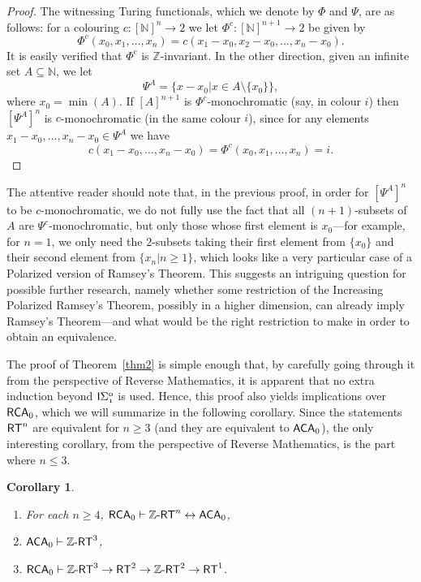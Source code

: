 \documentclass[10pt,a4paper]{amsart}
\newcommand{\rt}{\mathnormal{\mathsf{RT}}}
\newcommand{\zrt}{\mathnormal{\mathbb Z\text{-}\mathsf{RT}}}
\newcommand{\rca}{\mathnormal{\mathsf{RCA}}_0}
\newcommand{\aca}{\mathnormal{\mathsf{ACA}}_0}
\newcommand{\isigma}{\mathnormal{\mathsf{I}\mathrm{\Sigma}_1^0}}
\newtheorem{corollary}[theorem]{Corollary}
\theoremstyle{definition}
\begin{document}
\begin{proof}
The witnessing Turing functionals, which we denote by $\Phi$ and $\Psi$, are as follows: for a colouring $c:[\mathbb N]^n\longrightarrow 2$ we let $\Phi^c:[\mathbb N]^{n+1}\longrightarrow 2$ be given by
\begin{equation*}
\Phi^c(x_0,x_1,\ldots,x_n)=c(x_1-x_0,x_2-x_0,\ldots,x_n-x_0).
\end{equation*}
It is easily verified that $\Phi^c$ is $\mathbb Z$-invariant. In the other direction, given an infinite set $A\subseteq\mathbb N$, we let
\begin{equation*}
\Psi^A=\{x-x_0\big|x\in A\setminus\{x_0\}\},
\end{equation*}
where $x_0=\min(A)$. If $[A]^{n+1}$ is $\Phi^c$-monochromatic (say, in colour $i$) then $[\Psi^A]^n$ is $c$-monochromatic (in the same colour $i$), since for any elements $x_1-x_0,\ldots,x_n-x_0\in \Psi^A$ we have
\begin{equation*}
c(x_1-x_0,\ldots,x_n-x_0)=\Phi^c(x_0,x_1,\ldots,x_n)=i.
\end{equation*}
\end{proof}

The attentive reader should note that, in the previous proof, in order for $[\Psi^A]^n$ to be $c$-monochromatic, we do not fully use the fact that all $(n+1)$-subsets of $A$ are $\Psi^c$-monochromatic, but only those whose first element is $x_0$---for example, for $n=1$, we only need the $2$-subsets taking their first element from $\{x_0\}$ and their second element from $\{x_n\big|n\geq 1\}$, which looks like a very particular case of a Polarized version of Ramsey's Theorem. This suggests an intriguing question for possible further research, namely whether some restriction of the Increasing Polarized Ramsey's Theorem, possibly in a higher dimension, can already imply Ramsey's Theorem---and what would be the right restriction to make in order to obtain an equivalence.

The proof of Theorem~\ref{thm2} is simple enough that, by carefully going through it from the perspective of Reverse Mathematics, it is apparent that no extra induction beyond $\isigma$ is used. Hence, this proof also yields implications over $\rca$, which we will summarize in the following corollary. Since the statements $\rt^n$ are equivalent for $n\geq 3$ (and they are equivalent to $\aca$), the only interesting corollary, from the perspective of Reverse Mathematics, is the part where $n\leq 3$.

\begin{corollary}\label{cor:implicaciones-reverse}
\hfill
\begin{enumerate}
\item For each $n\geq 4$, $\rca\vdash\zrt^n\leftrightarrow\aca$,
\item $\aca\vdash\zrt^3$,
\item $\rca\vdash\zrt^3\rightarrow\rt^2\rightarrow\zrt^2\rightarrow\rt^1$.
\end{enumerate}
\end{corollary}
\end{document}
